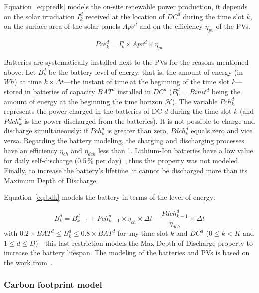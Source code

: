 Equation~\eqref{eq:predk} models the on-site renewable power production,  it depends on the solar irradiation $I^d_k$ received at the location of $DC^d$ during the time slot $k$, on the surface area of the solar panels $Apv^d$ and on the efficiency $\eta_{pv}$ of the PVs. 

\begin{equation} \label{eq:predk}
    Pre^d_{k}= I^d_k \times Apv^d \times \eta_{pv}
\end{equation}


Batteries are systematically installed next to the PVs for the reasons mentioned above. Let $B^d_k$ be the battery level of energy, that is, the amount of energy (in $Wh$) at time $k\times\Delta t$---the instant of time at the beginning of the time slot $k$---stored in batteries of capacity $BAT^d$ installed in $DC^d$ ($B^d_0 = Binit^d$ being the amount of energy at the beginning the time horizon $\mathcal{H}$). The variable $Pch_k^d$ represents the power charged in the batteries of DC $d$ during the time slot $k$ (and $Pdch_k^d$ is the power discharged from the batteries). It is not possible to charge and discharge simultaneously: if $Pch^d_k$ is greater than zero, $Pdch^d_k$ equals zero and vice versa. Regarding the battery modeling, the charging and discharging processes have an efficiency $\eta_{ch}$ and $\eta_{dch}$ less than 1. Lithium-Ion batteries have a low value for daily self-discharge (0.5\,\% per day)~\cite{wang2012_EDCS}, thus this property was not modeled. Finally, to increase the battery's lifetime, it cannot be discharged more than its Maximum Depth of Discharge.

Equation~\eqref{eq:bdk} models the battery in terms of the level of energy:

\begin{equation} \label{eq:bdk}
  B^d_k = B^d_{k-1}  + Pch^d_{k-1} \times \eta_{ch} \times \Delta{t} - \frac{Pdch^d_{k-1}}{\eta_{dch}} \times \Delta{t}
\end{equation}
with $0.2\times BAT^d \leq B^d_k\leq 0.8\times BAT^d$ for any time slot $k$ and $DC^d$ ($0\leq k<K$ and $1\leq d\leq D$)---this last restriction models the Max Depth of Discharge property to increase the battery lifespan. The modeling of the batteries and PVs is based on the work from~\citet{2021NICOD_ILP}.


\subsubsection{Carbon footprint model} \label{sec:footprintmodel_ccgrid}

